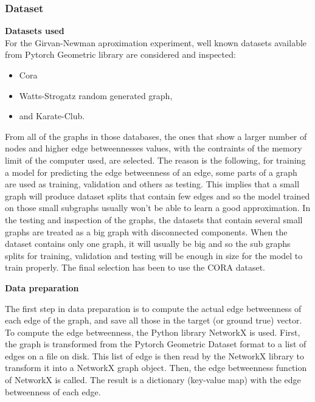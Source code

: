 \subsubsection{Dataset}


\textbf{Datasets used}\\
For the Girvan-Newman aproximation experiment, well known datasets available from Pytorch Geometric library are considered and inspected:
\begin{itemize}
	\item Cora
	\item Watts-Strogatz random generated graph,
	\item and Karate-Club.
\end{itemize}
From all of the graphs in those databases, the ones that show a larger number of nodes and higher edge betweennesses values, with the contraints of the memory limit of the computer used, are selected. The reason is the following, for training a model for predicting the edge betweenness of an edge, some parts of a graph are used as training, validation and others as testing. This implies that a small graph will produce dataset splits that contain few edges and so the model trained on those small subgraphs usually won't be able to learn a good approximation. In the testing and inspection of the graphs, the datasets that contain several small graphs are treated as a big graph with disconnected components. When the dataset contains only one graph, it will usually be big and so the sub graphs splits for training, validation and testing will be enough in size for the model to train properly. The final selection has been to use the CORA dataset. %



\textbf{Data preparation}

The first step in data preparation is to compute the actual edge betweenness of each edge of the graph, and save all those in the target (or ground true) vector. To compute the edge betweenness, the Python library NetworkX is used. First, the graph is transformed from the Pytorch Geometric Dataset format to a list of edges on a file on disk. This list of edge is then read by the NetworkX library to transform it into a NetworkX graph object. Then, the edge betweenness function of NetworkX is called. The result is a dictionary (key-value map) with the edge betweenness of each edge.


